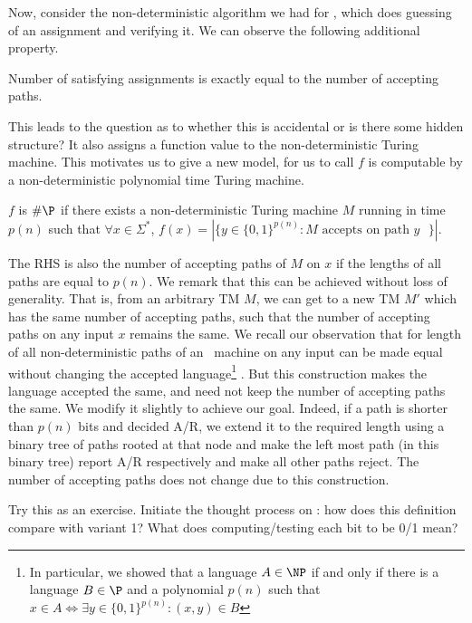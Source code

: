 Now, consider the non-deterministic algorithm
we had for \SAT, which does guessing of an assignment and verifying it. 
We can observe the following additional property.
\begin{observation}
Number of satisfying assignments is exactly equal to the number of accepting
paths.
\end{observation}
This leads to the question as to whether this is accidental or is there some
hidden structure? It also assigns a function value to the non-deterministic Turing machine.
This motivates us to give a new model, for us to call $f$ is computable by a non-deterministic polynomial time Turing machine.

\begin{definition}
$f$ is $\#\P$ if there exists a non-deterministic Turing machine $M$ running in time $p(n)$ such that 
$\forall x \in \Sigma^*$, $f(x) = \left| \{ y \in \{0,1\}^{p(n)}  : M \textrm{ accepts on path $y$ } \} \right|$.
\end{definition}

\begin{remark}
The RHS is also the number of accepting paths of $M$ on $x$ if the lengths of all paths are equal to $p(n)$.
We remark that this can be achieved without loss of generality. That is, from an arbitrary TM $M$, we can get to a new TM $M'$ which has the same number of accepting paths, such that the number of accepting paths on any input $x$ remains the same. We recall our observation that for length of all non-deterministic paths of an \NP~machine on any input can be made equal without changing the accepted language\footnote{In particular, we showed that a language $A \in \NP$ if and only if there is a language $B \in \P$ and a polynomial $p(n)$ such that $x \in A \iff \exists y \in \{0,1\}^{p(n)} : (x,y) \in B$} . But this construction makes the language accepted the same, and need not keep the number of accepting paths the same. We modify it slightly to achieve our goal.  Indeed, if a path is shorter than $p(n)$ bits and decided A/R, we extend it to the required length using a binary tree of paths rooted at that node and make the left most path (in this binary tree) report A/R respectively and make all other paths reject. The number of accepting paths does not change due to this construction.
\end{remark}

\begin{remark}
Try this as an exercise. Initiate the thought process on : how does this definition compare with variant 1? What does computing/testing each bit to be 0/1 mean?
\end{remark}

